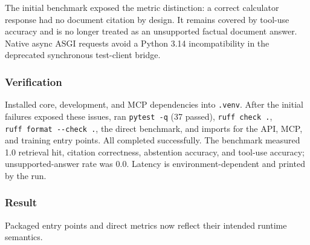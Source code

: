 The initial benchmark exposed the metric distinction: a correct calculator response had no document citation by design. It remains covered by tool-use accuracy and is no longer treated as an unsupported factual document answer. Native async ASGI requests avoid a Python 3.14 incompatibility in the deprecated synchronous test-client bridge.

\subsubsection{Verification}

Installed core, development, and MCP dependencies into \texttt{.venv}. After the initial failures exposed these issues, ran \texttt{pytest\ -q} (37 passed), \texttt{ruff\ check\ .}, \texttt{ruff\ format\ -\/-check\ .}, the direct benchmark, and imports for the API, MCP, and training entry points. All completed successfully. The benchmark measured 1.0 retrieval hit, citation correctness, abstention accuracy, and tool-use accuracy; unsupported-answer rate was 0.0. Latency is environment-dependent and printed by the run.

\subsubsection{Result}

Packaged entry points and direct metrics now reflect their intended runtime semantics.

